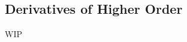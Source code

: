 \documentclass[../poma-notes.tex]{subfiles}
\begin{document}
\subsection*{Derivatives of Higher Order}

WIP
\end{document}
